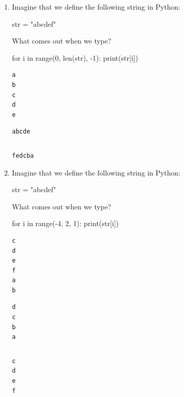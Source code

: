 \begin{enumerate}

\item Imagine that we define the following string in Python:

\begin{python}
str = "abcdef"
\end{python}

What comes out when we type?
\begin{python}
for i in range(0, len(str), -1):
        print(str[i])
\end{python}

\begin{choices}
\choice 
\begin{verbatim}
a
b
c
d
e
\end{verbatim}
\choice
\begin{verbatim}
abcde
\end{verbatim}
\choice %
\begin{verbatim}

\end{verbatim}
\choice
\begin{verbatim}
fedcba
\end{verbatim}
\end{choices}



\item Imagine that we define the following string in Python:

\begin{python}
str = "abcdef"
\end{python}

What comes out when we type?


\begin{python}
for i in range(-4, 2, 1):
        print(str[i])
\end{python}

\begin{choices}
    \choice %
\begin{verbatim}
c
d
e
f
a
b
\end{verbatim}
    \choice
\begin{verbatim}
d
c
b
a
\end{verbatim}
    \choice 
\begin{verbatim}

\end{verbatim}
    \choice
\begin{verbatim}
c
d
e
f
\end{verbatim}
\end{choices}


\end{enumerate}
